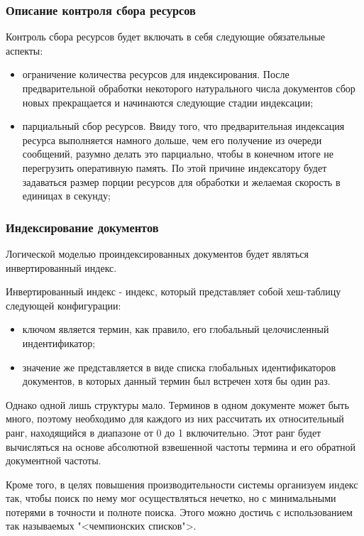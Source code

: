 \subsubsection{Описание контроля сбора ресурсов}
Контроль сбора ресурсов будет включать в себя следующие обязательные аспекты:
\begin{itemize}
\item ограничение количества ресурсов для индексирования. После предварительной обработки некоторого натурального числа документов сбор новых прекращается и начинаются следующие стадии индексации;
\item парциальный сбор ресурсов. Ввиду того, что предварительная индексация ресурса выполняется намного дольше, чем его получение из очереди сообщений, разумно делать это парциально, чтобы в конечном итоге не перегрузить оперативную память. По этой причине индексатору будет задаваться размер порции ресурсов для обработки и желаемая скорость в единицах в секунду;
\end{itemize}

\subsubsection{Индексирование документов}

Логической моделью проиндексированных документов будет являться инвертированный индекс. 

Инвертированный индекс - индекс, который представляет собой хеш-таблицу следующей конфигурации: 
\begin{itemize}
\item ключом является термин, как правило, его глобальный целочисленный индентификатор;
\item значение же представляется в виде списка глобальных идентификаторов документов, в которых данный термин был встречен хотя бы один раз.
\end{itemize}

Однако одной лишь структуры мало. Терминов в одном документе может быть много, поэтому необходимо для каждого из них рассчитать их относительный ранг, находящийся в диапазоне от 0 до 1 включительно. Этот ранг будет вычисляться на основе абсолютной взвешенной частоты термина и его обратной документной частоты.

Кроме того, в целях повышения производительности системы организуем индекс так, чтобы поиск по нему мог осуществляться нечетко, но с минимальными потерями в точности и полноте поиска. Этого можно достичь с использованием так называемых "<чемпионских списков">.

